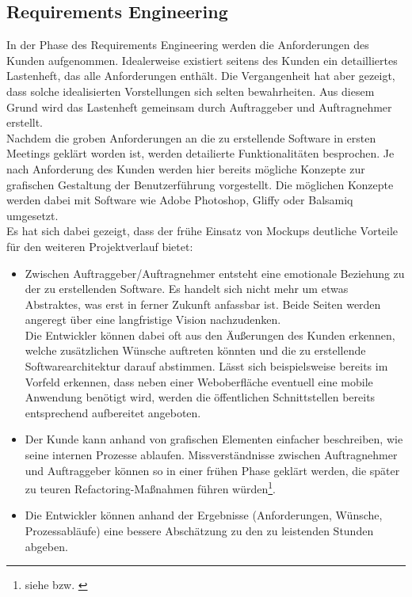 \documentclass[a4paper,12pt]{scrreprt}
\begin{document}
\subsection{Requirements Engineering}
In der Phase des Requirements Engineering werden die Anforderungen des Kunden aufgenommen.
Idealerweise existiert seitens des Kunden ein detailliertes Lastenheft, das alle Anforderungen enthält. Die Vergangenheit hat aber gezeigt, dass solche idealisierten Vorstellungen sich selten bewahrheiten.
Aus diesem Grund wird das Lastenheft gemeinsam durch Auftraggeber und Auftragnehmer erstellt.\\
Nachdem die groben Anforderungen an die zu erstellende Software in ersten Meetings geklärt worden ist, werden detailierte Funktionalitäten besprochen. Je nach Anforderung des Kunden werden hier bereits mögliche Konzepte zur grafischen Gestaltung der Benutzerführung vorgestellt. Die möglichen Konzepte werden dabei mit Software wie Adobe Photoshop, Gliffy oder Balsamiq umgesetzt.\\
Es hat sich dabei gezeigt, dass der frühe Einsatz von Mockups deutliche Vorteile für den weiteren Projektverlauf bietet:
\begin{itemize}
	\item Zwischen Auftraggeber/Auftragnehmer entsteht eine emotionale Beziehung zu der zu erstellenden Software. Es handelt sich nicht mehr um etwas Abstraktes, was erst in ferner Zukunft anfassbar ist. Beide Seiten werden angeregt über eine langfristige Vision nachzudenken.\\
	Die Entwickler können dabei oft aus den Äußerungen des Kunden erkennen, welche zusätzlichen Wünsche auftreten könnten und die zu erstellende Softwarearchitektur darauf abstimmen. Lässt sich beispielsweise bereits im Vorfeld erkennen, dass neben einer Weboberfläche eventuell eine mobile Anwendung benötigt wird, werden die öffentlichen Schnittstellen bereits entsprechend aufbereitet angeboten.
	\item Der Kunde kann anhand von grafischen Elementen einfacher beschreiben, wie seine internen Prozesse ablaufen. Missverständnisse zwischen Auftragnehmer und Auftraggeber können so in einer frühen Phase geklärt werden, die später zu teuren Refactoring-Maßnahmen führen würden\footnote{siehe \cite{cl2010} bzw. \cite{ebdu96}}.
	\item Die Entwickler können anhand der Ergebnisse (Anforderungen, Wünsche, Prozessabläufe) eine bessere Abschätzung zu den zu leistenden Stunden abgeben.
\end{itemize}
\end{document}
